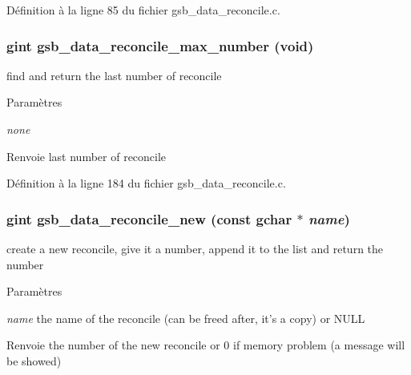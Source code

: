 Définition à la ligne 85 du fichier gsb\_\-data\_\-reconcile.c.

\subsubsection[{gsb\_\-data\_\-reconcile\_\-max\_\-number}]{\setlength{\rightskip}{0pt plus 5cm}gint gsb\_\-data\_\-reconcile\_\-max\_\-number (void)}\label{gsb__data__reconcile_8h_a4bf21657f3550be9b9d6257c99bc2b4c}
find and return the last number of reconcile


\begin{DoxyParams}{Paramètres}
\item[{\em none}]\end{DoxyParams}
\begin{DoxyReturn}{Renvoie}
last number of reconcile 
\end{DoxyReturn}


Définition à la ligne 184 du fichier gsb\_\-data\_\-reconcile.c.

\subsubsection[{gsb\_\-data\_\-reconcile\_\-new}]{\setlength{\rightskip}{0pt plus 5cm}gint gsb\_\-data\_\-reconcile\_\-new (const gchar $\ast$ {\em name})}\label{gsb__data__reconcile_8h_a62d7a52b2bf26c55b8a6cfe835aaf91a}
create a new reconcile, give it a number, append it to the list and return the number


\begin{DoxyParams}{Paramètres}
\item[{\em name}]the name of the reconcile (can be freed after, it's a copy) or NULL\end{DoxyParams}
\begin{DoxyReturn}{Renvoie}
the number of the new reconcile or 0 if memory problem (a message will be showed) 
\end{DoxyReturn}


